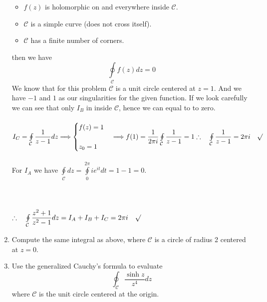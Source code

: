\documentclass[fleqn]{article}
\begin{document}
\begin{enumerate}
{\begin{itemize}
            \item $f(z)$ is holomorphic on and everywhere inside $\mathcal{C}$.
            \item $\mathcal{C}$ is a simple curve (does not cross itself).
            \item $\mathcal{C}$ has a finite number of corners.
          \end{itemize}
          then we have 
          $$\oint\limits_{\mathcal{C}} f(z) dz=0$$
          We know that for this problem $\mathcal{C}$ is a unit circle centered at $z=1$. And we have $-1$ and $1$ as 
          our singularities for the given function. If we look carefully we can see that only $I_B$ in inside $\mathcal{C}$,
          hence we can equal to to zero. \\
          \\
          $
            I_C=\oint\limits_{\mathcal{C}} \dfrac{1}{z-1}dz \Longrightarrow \begin{cases}
              f(z)=1 \\
              \\
              z_0=1 
            \end{cases}
            \Longrightarrow f(1)=\dfrac{1}{2 \pi i} \oint\limits_{\mathcal{C}} \dfrac{1}{z-1}=1 \\
            \\
            \\
            \therefore ~~~ \oint\limits_{\mathcal{C}} \dfrac{1}{z-1}=2 \pi i ~~~ \surd
          $ 
          \\
          \\
          For $I_A$ we have $\oint\limits_{\mathcal C} dz=\oint\limits_{0}^{2 \pi} i e^{it} dt=1-1=0$. \\
          \\
          \\
          \\
          $
            \therefore ~~~ \oint\limits_{\mathcal C} \dfrac{z^2+1}{z^2-1} dz=I_A+I_B+I_C=2 \pi i ~~~ \surd
          $
        }

      \item Compute the same integral as above, where $\mathcal{C}$ is a circle of radius 2 centered at $z = 0$.

      \pagebreak

      \item Use the generalized Cauchy's formula to evaluate
      $$
      \oint_{\mathcal C}   \frac{\sinh z}{z^4} dz
      $$
      where ${\mathcal C}$ is the unit circle centered at the origin.



\end{enumerate}
\end{document}

